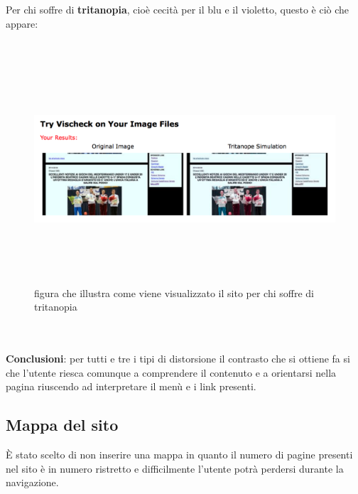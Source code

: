 	\\
	\\ Per chi soffre di \textbf{tritanopia}, cio\`e cecit\`a per il blu e il violetto, questo \`e ci\`o che appare:
	\\
	\\ 
	\begin{figure}[htbp]
		\centering
		\includegraphics[width=150mm, height=85mm]{images/contrasto_pagina_tritanope.png}
		\caption{figura che illustra come viene visualizzato il sito per chi soffre di tritanopia}
	\end{figure}
	\\
	\\ \textbf{Conclusioni}: per tutti e tre i tipi di distorsione il contrasto che si ottiene fa si che l'utente riesca comunque a comprendere il contenuto e a orientarsi nella pagina riuscendo ad interpretare il men\`u e i link presenti.

\subsection{Mappa del sito}
\`E stato scelto di non inserire una mappa in quanto il numero di pagine presenti nel sito \`e in numero ristretto e difficilmente l'utente potr\`a perdersi durante la navigazione.
